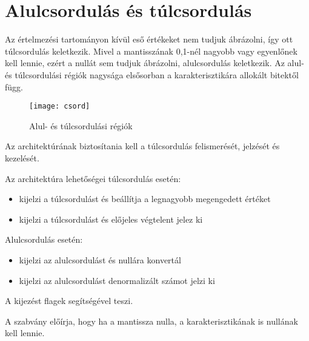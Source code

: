 \section{Alulcsordulás és túlcsordulás}
Az értelmezési tartományon kívül eső értékeket nem tudjuk ábrázolni, így ott túlcsordulás keletkezik.
Mivel a mantisszának 0,1-nél nagyobb vagy egyenlőnek kell lennie, ezért a nullát sem tudjuk ábrázolni, alulcsordulás keletkezik.
Az alul- és túlcsordulási régiók nagysága elsősorban a karakterisztikára allokált bitektől függ.
\begin{figure}[H]
    \texttt{[image: csord]}
    \centering
    \caption{Alul- és túlcsordulási régiók}
    \label{fig:csord}
\end{figure}

Az architektúrának biztosítania kell a túlcsordulás felismerését, jelzését és kezelését.

Az architektúra lehetőségei túlcsordulás esetén:
\begin{itemize}
    \item kijelzi a túlcsordulást és beállítja a legnagyobb megengedett értéket
    \item kijelzi a túlcsordulást és előjeles végtelent jelez ki
\end{itemize}
Alulcsordulás esetén:
\begin{itemize}
    \item kijelzi az alulcsordulást és nullára konvertál
    \item kijelzi az alulcsordulást denormalizált számot jelzi ki
\end{itemize}
A kijezést flagek segítségével teszi.

A szabvány előírja, hogy ha a mantissza nulla, a karakterisztikának is nullának kell lennie.

